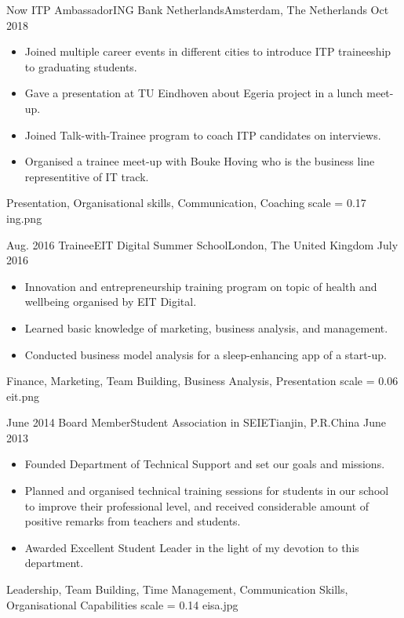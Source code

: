
\begin{experiences}
	\experience
	{Now}	{ITP Ambassador}{ING Bank Netherlands}{Amsterdam, The Netherlands}
	{Oct 2018}	{
		\begin{itemize}
			\item Joined multiple career events in different cities to introduce ITP traineeship to graduating students.
			\item Gave a presentation at TU Eindhoven about Egeria project in a lunch meet-up.
			\item Joined Talk-with-Trainee program to coach ITP candidates on interviews.
			\item Organised a trainee meet-up with Bouke Hoving who is the business line representitive of IT track.
		\end{itemize}
	}
	{Presentation, Organisational skills, Communication, Coaching}
	{scale = 0.17}		{ing.png} 
	\emptySeparator

	\experience
	{Aug. 2016}	{Trainee}{EIT Digital Summer School}{London, The United Kingdom}
	{July 2016}	{
		\begin{itemize}
			\item Innovation and entrepreneurship training program on topic of health and wellbeing organised by EIT Digital.
			\item Learned basic knowledge of marketing, business analysis, and management.
			\item Conducted business model analysis for a sleep-enhancing app of a start-up.
		\end{itemize}
	}
	{Finance, Marketing, Team Building, Business Analysis, Presentation}
	{scale = 0.06}		{eit.png} 
	\emptySeparator
	
	\experience
	{June 2014}	{Board Member}{Student Association in SEIE}{Tianjin, P.R.China}
	{June 2013}	{
		\begin{itemize}
			\item Founded Department of Technical Support and set our goals and missions.
			\item Planned and organised technical training sessions for students in our school to improve their professional level, and received considerable amount of positive remarks from teachers and students.
			\item Awarded Excellent Student Leader in the light of my devotion to this department.
		\end{itemize}
	}
	{Leadership, Team Building, Time Management, Communication Skills, Organisational Capabilities}
	{scale = 0.14}		{eisa.jpg} 
\end{experiences}